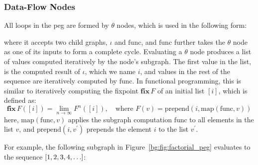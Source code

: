 \subsubsection{Data-Flow Nodes}

All loops in the \gls{peg} are formed by $\theta$ nodes, which is used in the
following form:
\begin{center}
    \vspace{-16.5pt}
    \vspace{-16.5pt}
\end{center}
where it accepts two child graphs, $\iota$ and $\mathrm{func}$, and
$\mathrm{func}$ further takes the $\theta$ node as one of its inputs to
form a complete cycle.  Evaluating a $\theta$ node produces a list of
values computed iteratively by the node's subgraph.  The first value in the
list, is the computed result of $\iota$, which we name $i$, and values in
the rest of the sequence are iteratively computed by $\mathrm{func}$.  In
functional programming, this is similar to iteratively computing the fixpoint
$\mathbf{fix}\,F$ of an initial list $[i]$, which is defined as:
\begin{equation}
    \mathbf{fix}\,F ([i]) = \lim_{n \to \infty} F^n ([i]),
    \quad\text{where~}
    F(v) = \mathrm{prepend}\left(
        i, \mathrm{map}\left( \mathrm{func}, v \right)
    \right)
\end{equation}
here, $\mathrm{map}(\mathrm{func}, v)$ applies the subgraph computation
$\mathrm{func}$ to all elements in the list $v$, and $\mathrm{prepend}(i,
v^\prime)$ prepends the element $i$ to the list $v^\prime$.

For example, the following subgraph in Figure~\ref{bg:fig:factorial_peg}
evaluates to the sequence $[1, 2, 3, 4, \mathellipsis]$:
\begin{center}
    \vspace{-16.5pt}
    \vspace{-16.5pt}
\end{center}


